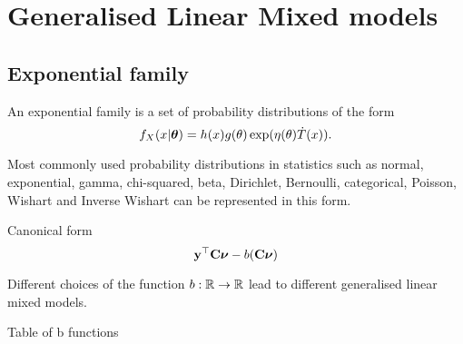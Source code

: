 \documentclass{article}[12pt]
\begin{document}
\section{Generalised Linear Mixed models}

\subsection{Exponential family}

An exponential family is a set of probability distributions of the form
$$
f_X(x|{\boldsymbol \theta}) = h(x) g(\theta) \exp(\eta(\theta) \dot T(x)).
$$

Most commonly used probability distributions in statistics such as normal, exponential, gamma,
chi-squared, beta, Dirichlet, Bernoulli, categorical, Poisson, Wishart and Inverse Wishart can
be represented in this form.

Canonical form
$$
{\bf y}^\top {\bf C} {\boldsymbol\nu} - b({\bf C} {\boldsymbol \nu})
$$

Different choices of the function $b:{\mathbb{R}} \to {\mathbb{R}}$ lead to different generalised linear mixed models.

Table of b functions



\end{document}
